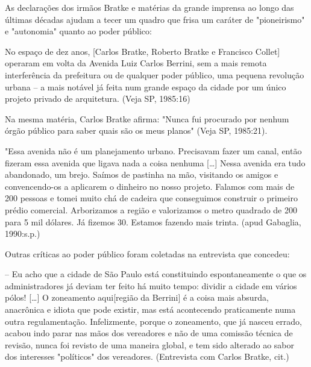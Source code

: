 	\begin{citacao}
		As declarações dos irmãos Bratke e matérias da grande imprensa ao longo das últimas décadas ajudam a tecer um quadro que frisa um caráter de "pioneirismo" e "autonomia" quanto ao poder público:
		
		\begin{citacao}
			No espaço de dez anos, [Carlos Bratke, Roberto Bratke e Francisco Collet] operaram em volta da Avenida Luiz Carlos Berrini, sem a mais remota interferência da prefeitura ou de qualquer poder público, uma pequena revolução urbana -- a mais notável já feita num grande espaço da cidade por um único projeto privado de arquitetura. (Veja SP, 1985:16)
		\end{citacao}
		
		Na mesma matéria, Carlos Bratke afirma: "Nunca fui procurado por nenhum órgão público para saber quais são os meus planos" (Veja SP, 1985:21).

		\begin{citacao}		
			"Essa avenida não é um planejamento urbano. Precisavam fazer um canal, então fizeram essa avenida que ligava nada a coisa nenhuma [\dots] Nessa avenida era tudo abandonado, um brejo. Saímos de pastinha na mão, visitando os amigos e convencendo-os a aplicarem o dinheiro no nosso projeto. Falamos com mais de 200 pessoas e tomei muito chá de cadeira que conseguimos construir o primeiro prédio comercial. Arborizamos a região e valorizamos o metro quadrado de 200 para 5 mil dólares. Já fizemos 30. Estamos fazendo mais trinta. (apud Gabaglia, 1990:s.p.)
		\end{citacao}
		
		Outras críticas ao poder público foram coletadas na entrevista que concedeu:
		
		\begin{citacao}
			-- Eu acho que a cidade de São Paulo está constituindo espontaneamente o que os administradores já deviam ter feito há muito tempo: dividir a cidade em vários pólos! [\dots] O zoneamento aqui[região da Berrini] é a coisa mais absurda, anacrônica e idiota que pode existir, mas está acontecendo praticamente numa outra regulamentação. Infelizmente, porque o zoneamento, que já nasceu errado, acabou indo parar nas mãos dos vereadores e não de uma comissão técnica de revisão, nunca foi revisto de uma maneira global, e tem sido alterado ao sabor dos interesses "políticos" dos vereadores. (Entrevista com Carlos Bratke, cit.)
		\end{citacao}

	\end{citacao}
	
